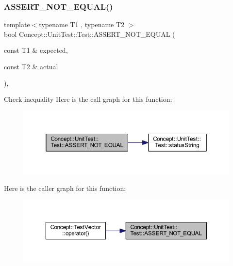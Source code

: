 \subsubsection{\texorpdfstring{ASSERT\_NOT\_EQUAL()}{ASSERT\_NOT\_EQUAL()}}
{\footnotesize\ttfamily template$<$typename T1 , typename T2 $>$ \\
bool Concept\+::\+Unit\+Test\+::\+Test\+::\+A\+S\+S\+E\+R\+T\+\_\+\+N\+O\+T\+\_\+\+E\+Q\+U\+AL (\begin{DoxyParamCaption}\item[{const T1 \&}]{expected,  }\item[{const T2 \&}]{actual }\end{DoxyParamCaption})\hspace{0.3cm}{\ttfamily [inline]}, {\ttfamily [protected]}}

Check inequality Here is the call graph for this function\+:\nopagebreak
\begin{figure}[H]
\begin{center}
\leavevmode
\includegraphics[width=350pt]{class_concept_1_1_unit_test_1_1_test_ad4d91c6b7d271d55fd037c2009b1927e_cgraph}
\end{center}
\end{figure}
Here is the caller graph for this function\+:\nopagebreak
\begin{figure}[H]
\begin{center}
\leavevmode
\includegraphics[width=350pt]{class_concept_1_1_unit_test_1_1_test_ad4d91c6b7d271d55fd037c2009b1927e_icgraph}
\end{center}
\end{figure}
\mbox{\label{class_concept_1_1_unit_test_1_1_test_a28c0cddd9719cd456fa92a142ae6c59d}} 
